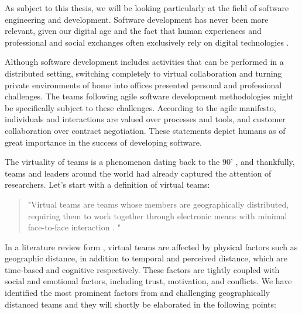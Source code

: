 As subject to this thesis,  we will be looking particularly at the field of software engineering and development.  Software development has never been more relevant, given our digital age and the fact that human experiences and professional and social exchanges often exclusively rely on digital technologies \cite{Yoo2010}.  

Although software development includes activities that can be performed in a distributed setting, switching completely to virtual collaboration and turning private environments of home into offices presented personal and professional challenges.  The teams following agile software development methodologies might be specifically subject to these challenges. According to the agile manifesto,  individuals and interactions are valued over processes and tools,  and customer collaboration over contract negotiation.  These statements depict humans as of great importance in the success of developing software.

The virtuality of teams is a phenomenon dating back to the 90' \cite{Geber1995}, and thankfully,  teams and leaders around the world had already captured the attention of researchers.  Let's start with a definition of virtual teams: 

\begin{quote}
"Virtual teams are teams whose members are geographically distributed, requiring them to work together through electronic means with minimal face-to-face interaction \cite{Malhotra2007}. "
\end{quote}

In a literature review form \cite{Morrison2020},  virtual teams are affected by physical factors such as geographic distance, in addition to temporal and perceived distance, which are time-based and cognitive respectively. These factors are tightly coupled with social and emotional factors, including trust, motivation, and conflicts.  We have identified the most prominent factors from \cite{Olson2000} and \cite{Morrison2020} challenging geographically distanced teams and they will shortly be elaborated in the following points: 

